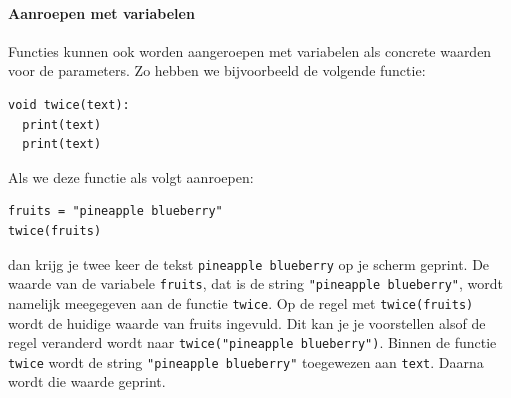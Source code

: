 \paragraph{Aanroepen met variabelen}

Functies kunnen ook worden aangeroepen met variabelen als concrete waarden voor de parameters. Zo hebben we bijvoorbeeld de volgende functie:

\vspace*{-\baselineskip}\begin{verbatim}
void twice(text):
  print(text)
  print(text)
\end{verbatim}\vspace*{-\baselineskip}

Als we deze functie als volgt aanroepen:

\vspace*{-\baselineskip}\begin{verbatim}
fruits = "pineapple blueberry"
twice(fruits)
\end{verbatim}\vspace*{-\baselineskip}

dan krijg je twee keer de tekst \texttt{pineapple blueberry} op je scherm geprint. De waarde van de variabele \texttt{fruits}, dat is de string \texttt{"pineapple blueberry"}, wordt namelijk meegegeven aan de functie \texttt{twice}. Op de regel met \texttt{twice(fruits)} wordt de huidige waarde van fruits  ingevuld. Dit kan je je voorstellen alsof de regel veranderd wordt naar \texttt{twice("pineapple blueberry")}. Binnen de functie \texttt{twice} wordt de string \texttt{"pineapple blueberry"} toegewezen aan \texttt{text}. Daarna wordt die waarde geprint.

%
%

